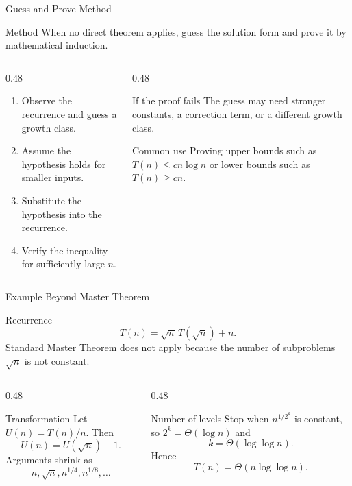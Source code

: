 \documentclass[aspectratio=169]{beamer}
\begin{document}
\begin{frame}{Guess-and-Prove Method}
  \small
  \begin{block}{Method}
    When no direct theorem applies, guess the solution form and prove it by mathematical induction.
  \end{block}
  \begin{columns}[T]
    \begin{column}{0.48\textwidth}
      \begin{enumerate}
        \item Observe the recurrence and guess a growth class.
        \item Assume the hypothesis holds for smaller inputs.
        \item Substitute the hypothesis into the recurrence.
        \item Verify the inequality for sufficiently large $n$.
      \end{enumerate}
    \end{column}
    \begin{column}{0.48\textwidth}
      \begin{alertblock}{If the proof fails}
        \small
        The guess may need stronger constants, a correction term, or a different growth class.
      \end{alertblock}
      \begin{exampleblock}{Common use}
        \small
        Proving upper bounds such as $T(n)\le cn\log n$ or lower bounds such as $T(n)\ge cn$.
      \end{exampleblock}
    \end{column}
  \end{columns}
\end{frame}

\begin{frame}{Example Beyond Master Theorem}
  \small
  \begin{block}{Recurrence}
    \[
      T(n)=\sqrt{n}\,T(\sqrt{n})+n.
    \]
    Standard Master Theorem does not apply because the number of subproblems $\sqrt n$ is not constant.
  \end{block}
  \begin{columns}[T]
    \begin{column}{0.48\textwidth}
      \begin{exampleblock}{Transformation}
        Let $U(n)=T(n)/n$. Then
        \[
          U(n)=U(\sqrt n)+1.
        \]
        Arguments shrink as
        \[
          n,\sqrt n,n^{1/4},n^{1/8},\ldots
        \]
      \end{exampleblock}
    \end{column}
    \begin{column}{0.48\textwidth}
      \begin{alertblock}{Number of levels}
        Stop when $n^{1/2^k}$ is constant, so $2^k=\Theta(\log n)$ and
        \[
          k=\Theta(\log\log n).
        \]
        Hence
        \[
          T(n)=\Theta(n\log\log n).
        \]
      \end{alertblock}
    \end{column}
  \end{columns}
\end{frame}
\end{document}

